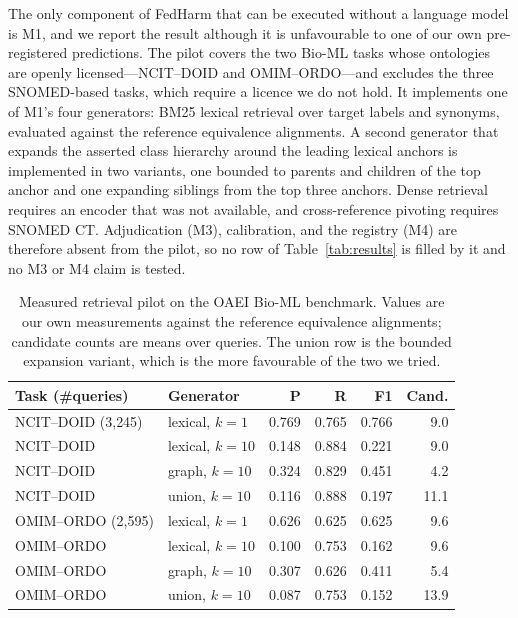 \documentclass[conference]{IEEEtran}
\begin{document}
The only component of FedHarm that can be executed without a language model is M1, and we report the result although it is unfavourable to one of our own pre-registered predictions. The pilot covers the two Bio-ML tasks whose ontologies are openly licensed---NCIT--DOID and OMIM--ORDO---and excludes the three SNOMED-based tasks, which require a licence we do not hold. It implements one of M1's four generators: BM25 lexical retrieval over target labels and synonyms, evaluated against the reference equivalence alignments. A second generator that expands the asserted class hierarchy around the leading lexical anchors is implemented in two variants, one bounded to parents and children of the top anchor and one expanding siblings from the top three anchors. Dense retrieval requires an encoder that was not available, and cross-reference pivoting requires SNOMED CT. Adjudication (M3), calibration, and the registry (M4) are therefore absent from the pilot, so no row of Table~\ref{tab:results} is filled by it and no M3 or M4 claim is tested.

\begin{table}[t]
\caption{Measured retrieval pilot on the OAEI Bio-ML benchmark. Values are our own measurements against the reference equivalence alignments; candidate counts are means over queries. The union row is the bounded expansion variant, which is the more favourable of the two we tried.}
\label{tab:pilot}
\centering
\footnotesize
\begin{tabular}{@{}llrrrr@{}}
\toprule
\textbf{Task (\#queries)} & \textbf{Generator} & \textbf{P} & \textbf{R} & \textbf{F1} & \textbf{Cand.} \\
\midrule
NCIT--DOID (3{,}245) & lexical, $k{=}1$  & 0.769 & 0.765 & 0.766 & 9.0 \\
NCIT--DOID           & lexical, $k{=}10$ & 0.148 & 0.884 & 0.221 & 9.0 \\
NCIT--DOID           & graph, $k{=}10$   & 0.324 & 0.829 & 0.451 & 4.2 \\
NCIT--DOID           & union, $k{=}10$   & 0.116 & 0.888 & 0.197 & 11.1 \\
\midrule
OMIM--ORDO (2{,}595) & lexical, $k{=}1$  & 0.626 & 0.625 & 0.625 & 9.6 \\
OMIM--ORDO           & lexical, $k{=}10$ & 0.100 & 0.753 & 0.162 & 9.6 \\
OMIM--ORDO           & graph, $k{=}10$   & 0.307 & 0.626 & 0.411 & 5.4 \\
OMIM--ORDO           & union, $k{=}10$   & 0.087 & 0.753 & 0.152 & 13.9 \\
\bottomrule
\end{tabular}
\end{table}
\end{document}
